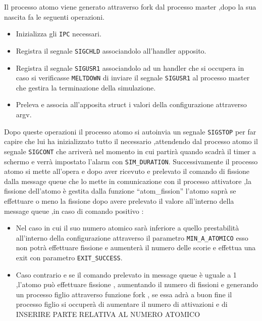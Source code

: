Il processo atomo viene generato attraverso fork dal processo master ,dopo la sua nascita fa le seguenti operazioni.
    \begin{itemize}
        \item Inizializza gli \texttt{IPC} necessari.
        \item Registra il segnale \texttt{SIGCHLD} associandolo all'handler apposito. 
        \item Registra il segnale \texttt{SIGUSR1} associandolo ad un handler che si occupera in caso si verificasse \texttt{MELTDOWN} di inviare il segnale \texttt{SIGUSR1} al processo master che gestira la terminazione della simulazione. 
        \item Preleva e associa all'apposita struct i valori della configurazione attraverso argv. 
    \end{itemize}
Dopo queste operazioni il processo atomo si autoinvia un segnale \texttt{SIGSTOP} per far capire che lui ha inizializzato tutto il necessario ,attendendo dal processo atomo il segnale \texttt{SIGCONT} che arriverà nel momento in cui partirà quando scadrà il timer a schermo e verrà impostato l'alarm con \texttt{SIM\_DURATION}.
Successivamente il processo atomo si mette all'opera e dopo aver ricevuto e prelevato il comando di fissione dalla message queue che lo mette in comunicazione con il processo attivatore ,la fissione dell'atomo è gestita dalla funzione \enquote{atom\_fission} l'atomo saprà se effettuare o meno la fissione dopo avere prelevato il valore all'interno della message queue ,in caso di comando positivo : 
\begin{itemize}
    \item Nel caso in cui il suo numero atomico sarà inferiore a quello prestabilità all'interno della configurazione attraverso il parametro \texttt{MIN\_A\_ATOMICO} esso non potrà effettuare fissione e aumenterà il numero delle scorie e effettua una exit con parametro \texttt{EXIT\_SUCCESS}.
    \item Caso contrario e se il comando prelevato in message queue è uguale a 1 ,l'atomo può effettuare fissione , aumentando il numero di fissioni e generando un processo figlio attraverso funzione fork , se essa adrà a buon fine il processo figlio si occuperà di aumentare il numero di attivazioni e di INSERIRE PARTE RELATIVA AL NUMERO ATOMICO 
\end{itemize}

